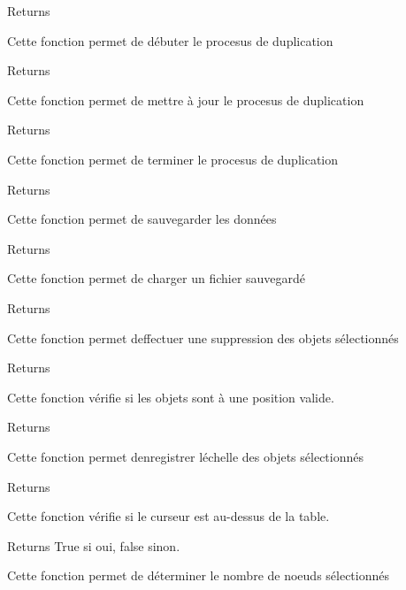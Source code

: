 \begin{DoxyReturn}{Returns}

\end{DoxyReturn}
Cette fonction permet de débuter le procesus de duplication

\begin{DoxyReturn}{Returns}

\end{DoxyReturn}
Cette fonction permet de mettre à jour le procesus de duplication

\begin{DoxyReturn}{Returns}

\end{DoxyReturn}
Cette fonction permet de terminer le procesus de duplication

\begin{DoxyReturn}{Returns}

\end{DoxyReturn}
Cette fonction permet de sauvegarder les données

\begin{DoxyReturn}{Returns}

\end{DoxyReturn}
Cette fonction permet de charger un fichier sauvegardé

\begin{DoxyReturn}{Returns}

\end{DoxyReturn}
Cette fonction permet d\textquotesingle{}effectuer une suppression des objets sélectionnés

\begin{DoxyReturn}{Returns}

\end{DoxyReturn}
Cette fonction vérifie si les objets sont à une position valide.

\begin{DoxyReturn}{Returns}

\end{DoxyReturn}
Cette fonction permet d\textquotesingle{}enregistrer l\textquotesingle{}échelle des objets sélectionnés

\begin{DoxyReturn}{Returns}

\end{DoxyReturn}
Cette fonction vérifie si le curseur est au-\/dessus de la table.

\begin{DoxyReturn}{Returns}
True si oui, false sinon.
\end{DoxyReturn}
Cette fonction permet de déterminer le nombre de noeuds sélectionnés

